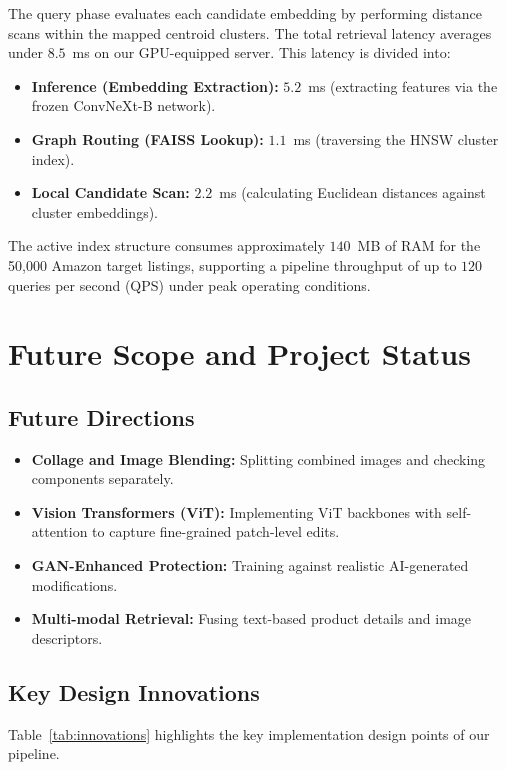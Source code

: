 \documentclass[11pt,a4paper]{article}
\begin{document}
The query phase evaluates each candidate embedding by performing distance scans within the mapped centroid clusters. The total retrieval latency averages under $8.5$~ms on our GPU-equipped server. This latency is divided into:
\begin{itemize}
    \item \textbf{Inference (Embedding Extraction):} $5.2$~ms (extracting features via the frozen ConvNeXt-B network).
    \item \textbf{Graph Routing (FAISS Lookup):} $1.1$~ms (traversing the HNSW cluster index).
    \item \textbf{Local Candidate Scan:} $2.2$~ms (calculating Euclidean distances against cluster embeddings).
\end{itemize}
The active index structure consumes approximately $140$~MB of RAM for the 50,000 Amazon target listings, supporting a pipeline throughput of up to $120$ queries per second (QPS) under peak operating conditions.

\vspace*{0.5\textheight}


\section{Future Scope and Project Status}

\subsection{Future Directions}
\begin{itemize}
    \item \textbf{Collage and Image Blending:} Splitting combined images and checking components separately.
    \item \textbf{Vision Transformers (ViT):} Implementing ViT backbones with self-attention to capture fine-grained patch-level edits.
    \item \textbf{GAN-Enhanced Protection:} Training against realistic AI-generated modifications.
    \item \textbf{Multi-modal Retrieval:} Fusing text-based product details and image descriptors.
\end{itemize}

\subsection{Key Design Innovations}
Table~\ref{tab:innovations} highlights the key implementation design points of our pipeline.
\end{document}
